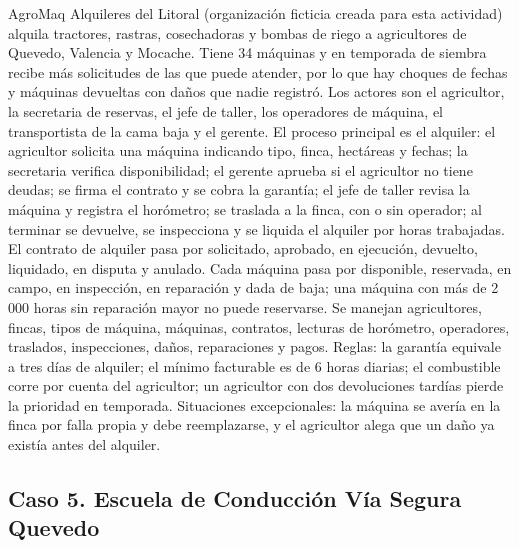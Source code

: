 \documentclass[11pt]{article}
\newcommand{\subseccion}[1]{\subsection{\textcolor{midblue}{#1}}}
\begin{document}
AgroMaq Alquileres del Litoral (organización ficticia creada para esta actividad) alquila tractores, rastras, cosechadoras y bombas de riego a agricultores de Quevedo, Valencia y Mocache. Tiene 34 máquinas y en temporada de siembra recibe más solicitudes de las que puede atender, por lo que hay choques de fechas y máquinas devueltas con daños que nadie registró. Los actores son el agricultor, la secretaria de reservas, el jefe de taller, los operadores de máquina, el transportista de la cama baja y el gerente. El proceso principal es el alquiler: el agricultor solicita una máquina indicando tipo, finca, hectáreas y fechas; la secretaria verifica disponibilidad; el gerente aprueba si el agricultor no tiene deudas; se firma el contrato y se cobra la garantía; el jefe de taller revisa la máquina y registra el horómetro; se traslada a la finca, con o sin operador; al terminar se devuelve, se inspecciona y se liquida el alquiler por horas trabajadas. El contrato de alquiler pasa por solicitado, aprobado, en ejecución, devuelto, liquidado, en disputa y anulado. Cada máquina pasa por disponible, reservada, en campo, en inspección, en reparación y dada de baja; una máquina con más de 2\,000 horas sin reparación mayor no puede reservarse. Se manejan agricultores, fincas, tipos de máquina, máquinas, contratos, lecturas de horómetro, operadores, traslados, inspecciones, daños, reparaciones y pagos. Reglas: la garantía equivale a tres días de alquiler; el mínimo facturable es de 6 horas diarias; el combustible corre por cuenta del agricultor; un agricultor con dos devoluciones tardías pierde la prioridad en temporada. Situaciones excepcionales: la máquina se avería en la finca por falla propia y debe reemplazarse, y el agricultor alega que un daño ya existía antes del alquiler.

\subseccion{Caso 5. Escuela de Conducción Vía Segura Quevedo}
\end{document}
